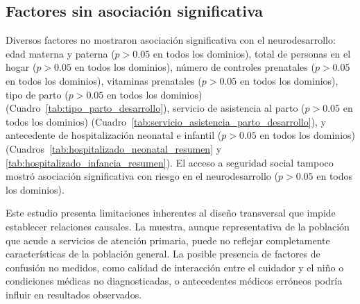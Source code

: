 \subsection{Factores sin asociación significativa}

Diversos factores no mostraron asociación significativa con el neurodesarrollo: 
edad materna y paterna ($p > 0.05$ en todos los dominios), total de personas en
el hogar ($p > 0.05$ en todos los dominios), número de controles prenatales
($p > 0.05$ en todos los dominios), vitaminas prenatales 
($p > 0.05$ en todos los dominios), 
tipo de parto ($p > 0.05$ en todos los dominios) 
(Cuadro~\ref{tab:tipo_parto_desarrollo}), servicio de asistencia al parto 
($p > 0.05$ en todos los dominios) 
(Cuadro~\ref{tab:servicio_asistencia_parto_desarrollo}), y antecedente de
hospitalización neonatal e infantil ($p > 0.05$ en todos los dominios) 
(Cuadros~\ref{tab:hospitalizado_neonatal_resumen} y 
\ref{tab:hospitalizado_infancia_resumen}). El acceso a seguridad social tampoco
mostró asociación significativa con riesgo en el neurodesarrollo ($p > 0.05$ en
todos los dominios). 

Este estudio presenta limitaciones inherentes al diseño transversal que impide 
establecer relaciones causales. La muestra, aunque representativa de la
población que acude a servicios de atención primaria, puede no reflejar
completamente características de la población general. La posible presencia de
factores de confusión no medidos, como calidad de interacción entre el cuidador
y el niño o condiciones médicas no diagnosticadas, o antecedentes médicos
erróneos podría influir en resultados observados.
